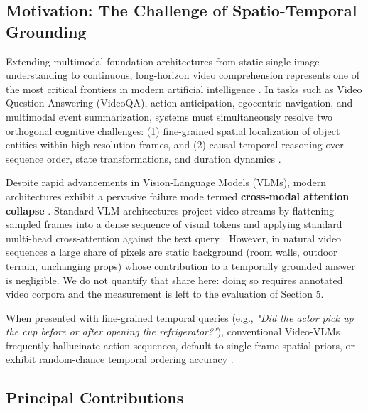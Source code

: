 \documentclass[10pt,journal,compsoc,twocolumn]{IEEEtran}
\begin{document}
\subsection{Motivation: The Challenge of Spatio-Temporal Grounding}


Extending multimodal foundation architectures from static single-image understanding to continuous, long-horizon video comprehension represents one of the most critical frontiers in modern artificial intelligence \cite{arxiv_2010_11146,arxiv_2005_14165}. In tasks such as Video Question Answering (VideoQA), action anticipation, egocentric navigation, and multimodal event summarization, systems must simultaneously resolve two orthogonal cognitive challenges: (1) fine-grained spatial localization of object entities within high-resolution frames, and (2) causal temporal reasoning over sequence order, state transformations, and duration dynamics \cite{arxiv_2203_02155,arxiv_2312_03893}.

Despite rapid advancements in Vision-Language Models (VLMs), modern architectures exhibit a pervasive failure mode termed \textbf{cross-modal attention collapse} \cite{arxiv_2406_00584}. Standard VLM architectures project video streams by flattening sampled frames into a dense sequence of visual tokens and applying standard multi-head cross-attention against the text query \cite{arxiv_2305_18290}. However, in natural video sequences a large share of pixels are static background (room walls, outdoor terrain, unchanging props) whose contribution to a temporally grounded answer is negligible. We do not quantify that share here: doing so requires annotated video corpora and the measurement is left to the evaluation of Section 5.

When presented with fine-grained temporal queries (e.g., \textit{"Did the actor pick up the cup before or after opening the refrigerator?"}), conventional Video-VLMs frequently hallucinate action sequences, default to single-frame spatial priors, or exhibit random-chance temporal ordering accuracy \cite{arxiv_2405_01543,crossref_10_1016_j_aei_2026_104392}.


\subsection{Principal Contributions}
\end{document}

